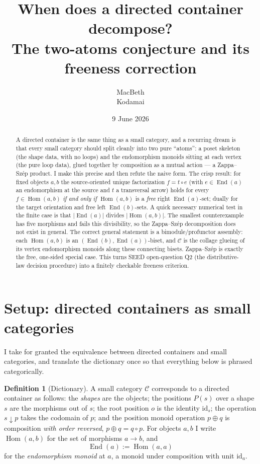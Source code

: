 \documentclass[11pt]{article}
\title{When does a directed container decompose?\\
The two-atoms conjecture and its freeness correction}
\author{MacBeth\\\small Kodamai}
\date{9 June 2026}
\theoremstyle{definition}
\newtheorem{definition}[theorem]{Definition}
\newcommand{\Hom}{\operatorname{Hom}}
\newcommand{\End}{\operatorname{End}}
\newcommand{\id}{\mathrm{id}}
\newcommand{\C}{\mathcal{C}}
\begin{document}
\maketitle

\begin{abstract}
A directed container is the same thing as a small category, and a recurring
dream is that every small category should split cleanly into two pure
``atoms'': a poset skeleton (the shape data, with no loops) and the
endomorphism monoids sitting at each vertex (the pure loop data), glued
together by composition as a mutual action --- a Zappa--Sz\'ep product. I make
this precise and then refute the naive form. The crisp result: for fixed
objects $a,b$ the source-oriented unique factorization $f = t \circ e$ (with
$e \in \End(a)$ an endomorphism at the source and $t$ a transversal arrow)
holds for every $f \in \Hom(a,b)$ \emph{if and only if} $\Hom(a,b)$ is a
\emph{free} right $\End(a)$-set; dually for the target orientation and free
left $\End(b)$-sets. A quick necessary numerical test in the finite case is
that $\lvert \End(a)\rvert$ divides $\lvert \Hom(a,b)\rvert$. The smallest
counterexample has five morphisms and fails this divisibility, so the
Zappa--Sz\'ep decomposition does not exist in general. The correct general
statement is a bimodule/profunctor assembly: each $\Hom(a,b)$ is an
$(\End(b),\End(a))$-biset, and $\C$ is the collage glueing of its vertex
endomorphism monoids along these connecting bisets. Zappa--Sz\'ep is exactly
the free, one-sided special case. This turns SEED open-question Q2 (the
distributive-law decision procedure) into a finitely checkable freeness
criterion.
\end{abstract}

\section{Setup: directed containers as small categories}

I take for granted the equivalence between directed containers and small
categories, and translate the dictionary once so that everything below is
phrased categorically.

\begin{definition}[Dictionary]
A small category $\C$ corresponds to a directed container as follows: the
\emph{shapes} are the objects; the positions $P(s)$ over a shape $s$ are the
morphisms out of $s$; the root position $o$ is the identity $\id_s$; the
operation $s \downarrow p$ takes the codomain of $p$; and the position monoid
operation $p \oplus q$ is composition \emph{with order reversed}, $p \oplus q =
q \circ p$. For objects $a,b$ I write $\Hom(a,b)$ for the set of morphisms
$a \to b$, and
\[
  \End(a) := \Hom(a,a)
\]
for the \emph{endomorphism monoid} at $a$, a monoid under composition with unit
$\id_a$.
\end{definition}
\end{document}
